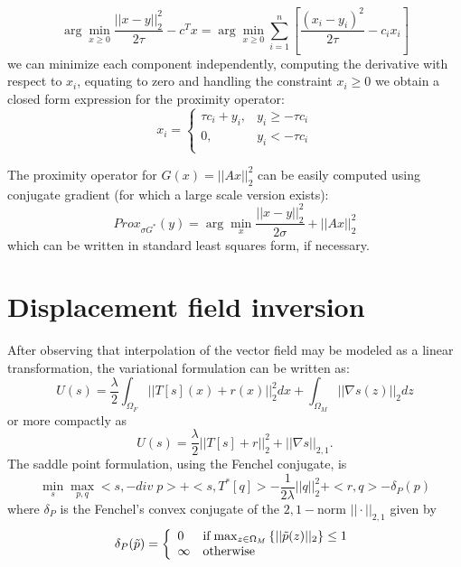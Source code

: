 \documentclass[12pt,draftcls, onecolumn, letterpaper,compsoc]{IEEEtran}
\begin{document}
\begin{displaymath}
    \arg\min_{x\geq 0} \frac{||x-y||_{2}^{2}}{2\tau} -c^Tx = \arg\min_{x\geq 0} \sum_{i=1}^{n}\left[\frac{(x_i - y_i)^{2}}{2\tau}-c_ix_i\right]
\end{displaymath}
we can minimize each component independently, computing the derivative with respect to $x_i$, equating to zero and handling the constraint $x_i \geq 0$ we obtain a closed form expression for the proximity operator:
\begin{displaymath}
    x_i =
    \left\lbrace\begin{array}{ll}
        \tau c_i + y_i, & y_i \geq - \tau c_i \\
        0, & y_i < -\tau c_i \\
    \end{array}\right.
\end{displaymath}

The proximity operator for $G(x) = ||Ax||_{2}^{2}$ can be easily computed using conjugate gradient (for which a large scale version exists):
\begin{displaymath}
    Prox_{\sigma G^{*}}(y) = \arg\min_{x} \frac{||x-y||_{2}^{2}}{2\sigma} + ||Ax||_{2}^{2}
\end{displaymath}
which can be written in standard least squares form, if necessary.

\section{Displacement field inversion}
After observing that interpolation of the vector field may be modeled as a linear transformation, the variational formulation can be written as:
\begin{equation}
	U(s) = \frac{\lambda}{2}\int_{\Omega_{F}} ||T[s](x) + r(x)||_{2}^{2}dx + \int_{\Omega_{M}}||\nabla s(z)||_{2}dz
\end{equation}
or more compactly as 
\begin{equation}
	U(s) = \frac{\lambda}{2}||T[s] + r||_{2}^{2} + ||\nabla s||_{2,1}.
\end{equation}
The saddle point formulation, using the Fenchel conjugate, is
\begin{equation}
	\min_{s}\max_{p,q} <s, -div\;p> + <s, T^{*}[q]> -\frac{1}{2\lambda}||q||_{2}^{2}+<r,q>-\delta_{P}(p)
\end{equation}
where $\delta_{P}$ is the Fenchel's convex conjugate of the $2,1-$norm $||\cdot||_{2,1}$ given by
\begin{equation}
	\delta_{P}(\tilde{p}) = \left\lbrace
		\begin{array}{ll}
			0 & $if\;$ \max_{z\in\Omega_{M}}\left\lbrace ||\tilde{p}(z)||_{2}\right\rbrace\leq 1\\
			\infty & $otherwise$
		\end{array}\right.
\end{equation}
\end{document}
